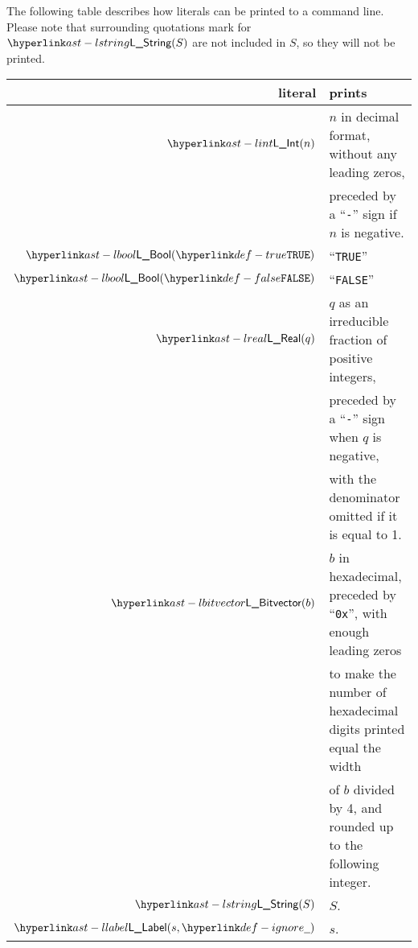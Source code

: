 The following table describes how literals can be printed to a command line.
%
Please note that surrounding quotations mark for $\lstring(S)$ are not included
in $S$, so they will not be printed.

\begin{tabular}{rl}
  \textbf{literal} & \textbf{prints} \\
  \hline
  $\lint(n)$ & $n$ in decimal format, without any leading zeros, \\
             & preceded by a ``\texttt{-}'' sign if $n$ is negative. \\
  $\lbool(\True)$ & ``\texttt{TRUE}'' \\
  $\lbool(\False)$ & ``\texttt{FALSE}'' \\
  $\lreal(q)$ & $q$ as an irreducible fraction of positive integers, \\
              & preceded by a ``\texttt{-}'' sign when $q$ is negative, \\
              & with the denominator omitted if it is equal to 1. \\
  $\lbitvector(b)$ & $b$ in hexadecimal, preceded by ``\texttt{0x}'', with enough leading zeros \\
                   & to make the number of hexadecimal digits printed equal the width \\
                   & of $b$ divided by 4, and rounded up to the following integer. \\
  $\lstring(S)$ & $S$. \\
  $\llabel(s, \Ignore)$ & $s$. \\
\end{tabular}
